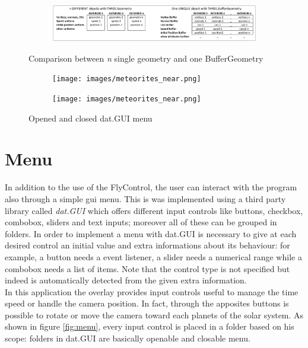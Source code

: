 \documentclass[paper=a4, fontsize=11pt]{scrartcl} %
\numberwithin{equation}{section} %
\numberwithin{figure}{section} %
\numberwithin{table}{section} %
\theoremstyle{definition}
\begin{document}
\begin{figure}
	\centering
	\begin{subfigure}{\textwidth}
		\centering
		\includegraphics[width=1.0\linewidth]{images/asteroids_geometry.png}
	\end{subfigure}
	\caption{Comparison between \textit{n} single geometry and one BufferGeometry}
	\label{fig:buffer_geometry}
\end{figure}
\newline
\begin{figure}
	\centering
	\begin{subfigure}{.4\textwidth}
		\centering
		\texttt{[image: images/meteorites\_near.png]}
	\end{subfigure}
	\begin{subfigure}{.4\textwidth}
		\centering
		\texttt{[image: images/meteorites\_near.png]}
	\end{subfigure}
	\caption{Opened and closed dat.GUI menu}
	\label{fig:meteorites}
\end{figure}

\section{Menu}

In addition to the use of the FlyControl, the user can interact with the program also through a simple gui menu. This is was implemented using a third party library called \textit{dat.GUI} \cite{datgui} which offers different input controls like buttons, checkbox, combobox, sliders and text inputs; moreover all of these can be grouped in folders. In order to implement a menu with dat.GUI is necessary to give at each desired control an initial value and extra informations about its behaviour: for example, a button needs a event listener, a slider needs a numerical range while a combobox needs a list of items. Note that the control type is not specified but indeed is automatically detected from the given extra information.\\
In this application the overlay provides input controls useful to manage the time speed or handle the camera position. In fact, through the apposites buttons is possible to rotate or move the camera toward each planets of the solar system.
As shown in figure \ref{fig:menu}, every input control is placed in a folder based on his scope: folders in dat.GUI are basically openable and closable menu.\\
\end{document}
